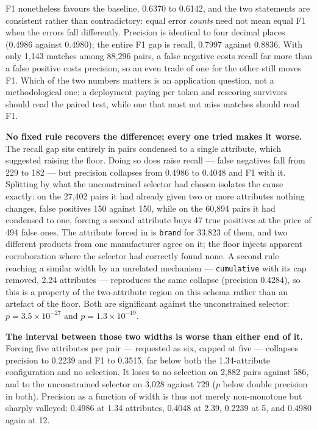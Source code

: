 \documentclass[11pt]{article}
\begin{document}
F1 nonetheless favours the baseline, 0.6370 to 0.6142, and the two statements are
consistent rather than contradictory: equal error \emph{counts} need not mean equal F1 when
the errors fall differently. Precision is identical to four decimal places (0.4986 against
0.4980); the entire F1 gap is recall, 0.7997 against 0.8836. With only 1{,}143 matches among
88{,}296 pairs, a false negative costs recall far more than a false positive costs precision,
so an even trade of one for the other still moves F1. Which of the two numbers matters is an
application question, not a methodological one: a deployment paying per token and rescoring
survivors should read the paired test, while one that must not miss matches should read F1.

\textbf{No fixed rule recovers the difference; every one tried makes it worse.} The recall
gap sits entirely in pairs condensed to a single attribute, which suggested raising the
floor. Doing so does raise recall --- false negatives fall from 229 to 182 --- but precision
collapses from 0.4986 to 0.4048 and F1 with it. Splitting by what the unconstrained selector
had chosen isolates the cause exactly: on the 27{,}402 pairs it had already given two or more
attributes nothing changes, false positives 150 against 150, while on the 60{,}894 pairs it
had condensed to one, forcing a second attribute buys 47 true positives at the price of 494
false ones. The attribute forced in is \texttt{brand} for 33{,}823 of them, and two different
products from one manufacturer agree on it; the floor injects apparent corroboration where
the selector had correctly found none. A second rule reaching a similar width by an unrelated
mechanism --- \texttt{cumulative} with its cap removed, 2.24 attributes --- reproduces the
same collapse (precision 0.4284), so this is a property of the two-attribute region on this
schema rather than an artefact of the floor. Both are significant against the unconstrained
selector: $p = 3.5\times10^{-27}$ and $p = 1.3\times10^{-19}$.

\textbf{The interval between those two widths is worse than either end of it.} Forcing five
attributes per pair --- requested as six, capped at five --- collapses precision to 0.2239
and F1 to 0.3515, far below both the 1.34-attribute configuration and no selection. It loses
to no selection on 2{,}882 pairs against 586, and to the unconstrained selector on 3{,}028
against 729 ($p$ below double precision in both). Precision as a function of width is thus
not merely non-monotone but sharply valleyed: 0.4986 at 1.34 attributes, 0.4048 at 2.39,
0.2239 at 5, and 0.4980 again at 12.
\end{document}
